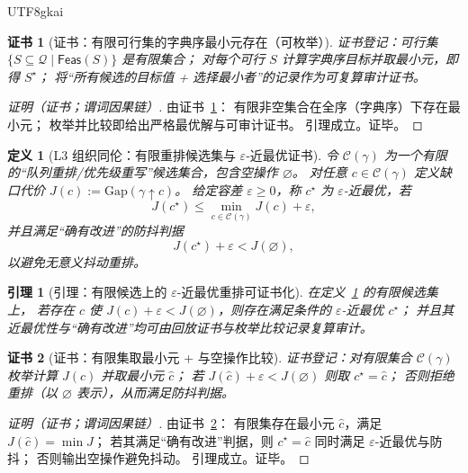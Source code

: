 \documentclass[12pt]{article}
\newtheorem{definition}{定义}[section]
\newtheorem{lemma}{引理}[section]
\newtheorem{Certificate}{证书}[section]
\begin{document}
\begin{CJK*}{UTF8}{gkai}
\begin{Certificate}[证书：有限可行集的字典序最小元存在（可枚举）]
\label{cert:openra-l1-slicing-optimal-certificate}
证书登记：可行集 $\{S\subseteq\mathcal{Q}\mid \mathsf{Feas}(S)\}$ 是有限集合；
对每个可行 $S$ 计算字典序目标并取最小元，即得 $S^\star$；
将“所有候选的目标值 + 选择最小者”的记录作为可复算审计证书。
\end{Certificate}

\begin{proof}[证明（证书；谓词因果链）]
由证书~\ref{cert:openra-l1-slicing-optimal-certificate}：
有限非空集合在全序（字典序）下存在最小元；
枚举并比较即给出严格最优解与可审计证书。
引理成立。证毕。
\end{proof}

\begin{definition}[L3 组织同伦：有限重排候选集与 $\varepsilon$-近最优证书]
\label{def:openra-l3-organization-homotopy}
令 $\mathcal{C}(\gamma)$ 为一个有限的“队列重排/优先级重写”候选集合，包含空操作 $\varnothing$。
对任意 $c\in\mathcal{C}(\gamma)$ 定义缺口代价 $J(c):=\mathrm{Gap}(\gamma\uparrow c)$。
给定容差 $\varepsilon\ge 0$，称 $c^\star$ 为 $\varepsilon$-近最优，若
\[
  J(c^\star)\le \min_{c\in\mathcal{C}(\gamma)} J(c) + \varepsilon,
\]
并且满足“确有改进”的防抖判据
\[
  J(c^\star)+\varepsilon < J(\varnothing),
\]
以避免无意义抖动重排。
\end{definition}

\begin{lemma}[引理：有限候选上的 $\varepsilon$-近最优重排可证书化]
\label{lem:openra-l3-epsilon-optimal-certificate}
在定义~\ref{def:openra-l3-organization-homotopy} 的有限候选集上，
若存在 $c$ 使 $J(c)+\varepsilon<J(\varnothing)$，则存在满足条件的 $\varepsilon$-近最优 $c^\star$；
并且其近最优性与“确有改进”均可由回放证书与枚举比较记录复算审计。
\end{lemma}

\begin{Certificate}[证书：有限集取最小元 + 与空操作比较]
\label{cert:openra-l3-epsilon-optimal-certificate}
证书登记：对有限集合 $\mathcal{C}(\gamma)$ 枚举计算 $J(c)$ 并取最小元 $\hat c$；
若 $J(\hat c)+\varepsilon<J(\varnothing)$ 则取 $c^\star=\hat c$；
否则拒绝重排（以 $\varnothing$ 表示），从而满足防抖判据。
\end{Certificate}

\begin{proof}[证明（证书；谓词因果链）]
由证书~\ref{cert:openra-l3-epsilon-optimal-certificate}：
有限集存在最小元 $\hat c$，满足 $J(\hat c)=\min J$；
若其满足“确有改进”判据，则 $c^\star=\hat c$ 同时满足 $\varepsilon$-近最优与防抖；
否则输出空操作避免抖动。
引理成立。证毕。
\end{proof}


\end{CJK*}
\end{document}
